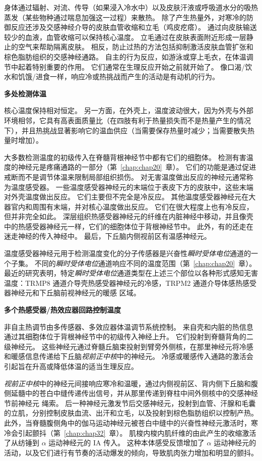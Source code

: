 身体通过辐射、对流、传导（如果浸入冷水中）以及皮肤汗液或呼吸道水分的吸热蒸发（某些物种通过喘息加强这一过程）来散热。
除了产生热量外，对寒冷的防御反应还涉及交感神经介导的皮肤血管收缩和立毛（鸡皮疙瘩）。
通过向皮肤输送较少的血液，血管收缩可以保持核心温度。
立毛通过在皮肤表面附近形成一层静止的空气来帮助隔离皮肤。
相反，防止过热的方法包括抑制激活皮肤血管扩张和棕色脂肪组织的交感神经通路。
自主的行为反应，如游泳或穿上毛衣，在体温调节中起着特别重要的作用。
它们通常在生理反应开始之前就开始了。
像口渴/饮水和饥饿/进食一样，响应冷或热挑战而产生的活动是有动机的行为。


\textbf{多处检测体温}

核心温度保持相对恒定。
另一方面，在外壳上，温度波动很大，因为外壳与外部环境相邻，它具有高表面质量比（在四肢有利于热量损失而不是热量产生的情况下），并且热挑战显著影响它的温血供应（当需要保存热量时减少；当需要散失热量时增加）。


大多数检测温度的初级传入在脊髓背根神经节中都有它们的细胞体。
检测有害温度的神经元是疼痛通路的一部分（第~\ref{chap:chap20}~章）。
它们的功能是通过促进戒断而不是调节体温来限制局部组织损伤。
对无害温度做出反应的神经元通常称为温度感受器。
一些温度感受器神经元的末端位于表皮下方的皮肤中，这些末端对外壳温度做出反应。
它们主要但不完全是冷反应。 其他温度感受器神经元在大器官内和周围有末端，并对核心温度做出反应。
它们在很大程度上也有冷反应，但并非完全如此。
深层组织热感受器神经元的纤维在内脏神经中移动，并且像壳中的热感受器神经元一样，它们的细胞体位于背根神经节中。
此外，有的还走在迷走神经的传入神经中。 最后，下丘脑内侧视前区有温感神经元。


温度感受器神经元用于检测温度变化的分子传感器是兴奋性\textit{瞬时受体电位}通道的一个子集。
不同的\textit{瞬时受体电位}通道响应不同的温度范围（第~\ref{chap:chap20}~章）。
最近的研究表明，特定\textit{瞬时受体电位}通道类型在上述三个部位以各种形式感知无害温度：TRMP8 通道介导壳热感受器神经元的冷感，TRPM2 通道介导体感热感受器神经元和下丘脑前视神经元的暖感 区域。


\textbf{多个热感受器/热效应器回路控制温度}

非自主热调节由多传感器、多效应器体温调节系统控制。
来自壳和内脏的热信息通过其细胞体位于背根神经节中的初级传入神经上升。
它们投射到脊髓背角的二级神经元。
这些神经元通过脊髓丘脑束投射到臂旁外侧核，在那里神经元将冷感和暖感信息传递给下丘脑\textit{视前正中核}中的神经元。
冷感或暖感传入通路的激活会引起旨在升高或降低体温的适当生理反应。


\textit{视前正中核}中的神经元间接响应寒冷和温暖，通过内侧视前区、背内侧下丘脑和腹侧延髓中的苍白中缝传递传出信号，并从那里传递到脊柱中间外侧核中的交感神经节前神经元 绳索。
后一种神经元激发节后交感神经元，投射到血管、汗腺和毛囊的立肌，分别控制皮肤血流、出汗和立毛，以及投射到棕色脂肪组织以控制产热。
此外，当脊髓腹侧角中的伽马运动神经元被苍白中缝中的兴奋性神经元激活时，寒冷会引起颤抖（第~\ref{chap:chap32}~章）。
肌梭内梭内肌纤维的由此产生的收缩激活了从纺锤到 $ \alpha $ 运动神经元的 IA 传入。
这种本体感受反馈增加了 $ \alpha $ 运动神经元的活动，以及它们进行有节奏的活动爆发的倾向，导致肌肉张力增加和明显的颤抖。


